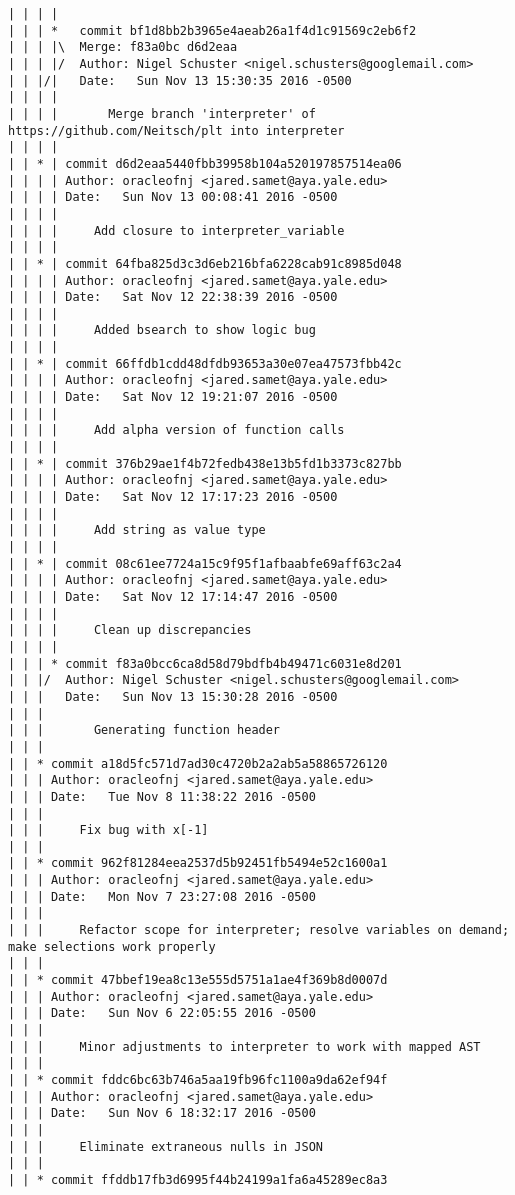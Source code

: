\begin{lstlisting}
| | | |       
| | | *   commit bf1d8bb2b3965e4aeab26a1f4d1c91569c2eb6f2
| | | |\  Merge: f83a0bc d6d2eaa
| | | |/  Author: Nigel Schuster <nigel.schusters@googlemail.com>
| | |/|   Date:   Sun Nov 13 15:30:35 2016 -0500
| | | |   
| | | |       Merge branch 'interpreter' of https://github.com/Neitsch/plt into interpreter
| | | |     
| | * | commit d6d2eaa5440fbb39958b104a520197857514ea06
| | | | Author: oracleofnj <jared.samet@aya.yale.edu>
| | | | Date:   Sun Nov 13 00:08:41 2016 -0500
| | | | 
| | | |     Add closure to interpreter_variable
| | | |     
| | * | commit 64fba825d3c3d6eb216bfa6228cab91c8985d048
| | | | Author: oracleofnj <jared.samet@aya.yale.edu>
| | | | Date:   Sat Nov 12 22:38:39 2016 -0500
| | | | 
| | | |     Added bsearch to show logic bug
| | | |     
| | * | commit 66ffdb1cdd48dfdb93653a30e07ea47573fbb42c
| | | | Author: oracleofnj <jared.samet@aya.yale.edu>
| | | | Date:   Sat Nov 12 19:21:07 2016 -0500
| | | | 
| | | |     Add alpha version of function calls
| | | |     
| | * | commit 376b29ae1f4b72fedb438e13b5fd1b3373c827bb
| | | | Author: oracleofnj <jared.samet@aya.yale.edu>
| | | | Date:   Sat Nov 12 17:17:23 2016 -0500
| | | | 
| | | |     Add string as value type
| | | |     
| | * | commit 08c61ee7724a15c9f95f1afbaabfe69aff63c2a4
| | | | Author: oracleofnj <jared.samet@aya.yale.edu>
| | | | Date:   Sat Nov 12 17:14:47 2016 -0500
| | | | 
| | | |     Clean up discrepancies
| | | |     
| | | * commit f83a0bcc6ca8d58d79bdfb4b49471c6031e8d201
| | |/  Author: Nigel Schuster <nigel.schusters@googlemail.com>
| | |   Date:   Sun Nov 13 15:30:28 2016 -0500
| | |   
| | |       Generating function header
| | |    
| | * commit a18d5fc571d7ad30c4720b2a2ab5a58865726120
| | | Author: oracleofnj <jared.samet@aya.yale.edu>
| | | Date:   Tue Nov 8 11:38:22 2016 -0500
| | | 
| | |     Fix bug with x[-1]
| | |    
| | * commit 962f81284eea2537d5b92451fb5494e52c1600a1
| | | Author: oracleofnj <jared.samet@aya.yale.edu>
| | | Date:   Mon Nov 7 23:27:08 2016 -0500
| | | 
| | |     Refactor scope for interpreter; resolve variables on demand; make selections work properly
| | |    
| | * commit 47bbef19ea8c13e555d5751a1ae4f369b8d0007d
| | | Author: oracleofnj <jared.samet@aya.yale.edu>
| | | Date:   Sun Nov 6 22:05:55 2016 -0500
| | | 
| | |     Minor adjustments to interpreter to work with mapped AST
| | |    
| | * commit fddc6bc63b746a5aa19fb96fc1100a9da62ef94f
| | | Author: oracleofnj <jared.samet@aya.yale.edu>
| | | Date:   Sun Nov 6 18:32:17 2016 -0500
| | | 
| | |     Eliminate extraneous nulls in JSON
| | |    
| | * commit ffddb17fb3d6995f44b24199a1fa6a45289ec8a3

\end{lstlisting}
